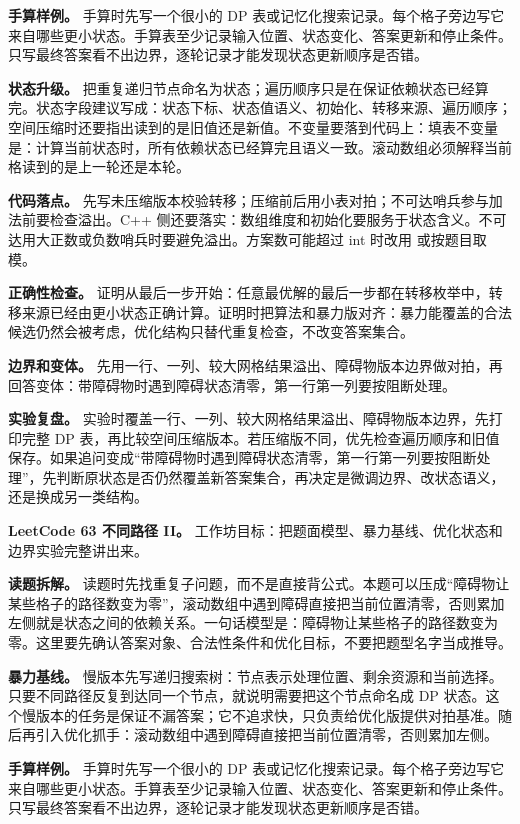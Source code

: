 \textbf{手算样例。} 手算时先写一个很小的 DP 表或记忆化搜索记录。每个格子旁边写它来自哪些更小状态。手算表至少记录输入位置、状态变化、答案更新和停止条件。只写最终答案看不出边界，逐轮记录才能发现状态更新顺序是否错。

\textbf{状态升级。} 把重复递归节点命名为状态；遍历顺序只是在保证依赖状态已经算完。状态字段建议写成：状态下标、状态值语义、初始化、转移来源、遍历顺序；空间压缩时还要指出读到的是旧值还是新值。不变量要落到代码上：填表不变量是：计算当前状态时，所有依赖状态已经算完且语义一致。滚动数组必须解释当前格读到的是上一轮还是本轮。

\textbf{代码落点。} 先写未压缩版本校验转移；压缩前后用小表对拍；不可达哨兵参与加法前要检查溢出。C++ 侧还要落实：数组维度和初始化要服务于状态含义。不可达用大正数或负数哨兵时要避免溢出。方案数可能超过 int 时改用  或按题目取模。

\textbf{正确性检查。} 证明从最后一步开始：任意最优解的最后一步都在转移枚举中，转移来源已经由更小状态正确计算。证明时把算法和暴力版对齐：暴力能覆盖的合法候选仍然会被考虑，优化结构只替代重复检查，不改变答案集合。

\textbf{边界和变体。} 先用一行、一列、较大网格结果溢出、障碍物版本边界做对拍，再回答变体：带障碍物时遇到障碍状态清零，第一行第一列要按阻断处理。

\textbf{实验复盘。} 实验时覆盖一行、一列、较大网格结果溢出、障碍物版本边界，先打印完整 DP 表，再比较空间压缩版本。若压缩版不同，优先检查遍历顺序和旧值保存。如果追问变成“带障碍物时遇到障碍状态清零，第一行第一列要按阻断处理”，先判断原状态是否仍然覆盖新答案集合，再决定是微调边界、改状态语义，还是换成另一类结构。

\noindent\textbf{LeetCode 63 不同路径 II。} 工作坊目标：把题面模型、暴力基线、优化状态和边界实验完整讲出来。

\textbf{读题拆解。} 读题时先找重复子问题，而不是直接背公式。本题可以压成“障碍物让某些格子的路径数变为零”，滚动数组中遇到障碍直接把当前位置清零，否则累加左侧就是状态之间的依赖关系。一句话模型是：障碍物让某些格子的路径数变为零。这里要先确认答案对象、合法性条件和优化目标，不要把题型名字当成推导。

\textbf{暴力基线。} 慢版本先写递归搜索树：节点表示处理位置、剩余资源和当前选择。只要不同路径反复到达同一个节点，就说明需要把这个节点命名成 DP 状态。这个慢版本的任务是保证不漏答案；它不追求快，只负责给优化版提供对拍基准。随后再引入优化抓手：滚动数组中遇到障碍直接把当前位置清零，否则累加左侧。

\textbf{手算样例。} 手算时先写一个很小的 DP 表或记忆化搜索记录。每个格子旁边写它来自哪些更小状态。手算表至少记录输入位置、状态变化、答案更新和停止条件。只写最终答案看不出边界，逐轮记录才能发现状态更新顺序是否错。

